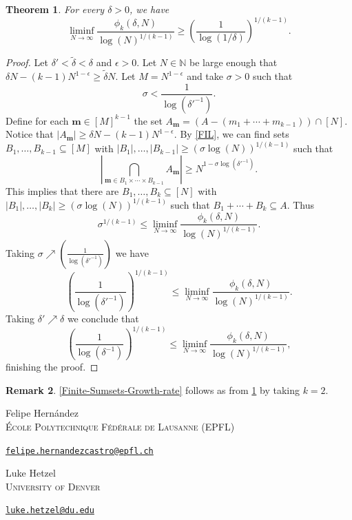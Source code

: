 \documentclass[letter, 11pt]{article}
\theoremstyle{plain} %
\newtheorem{theorem}{Theorem}[section]
\theoremstyle{definition} %
\newtheorem{remark}[theorem]{Remark}
\theoremstyle{plain}
\theoremstyle{plain}
\newcommand{\N}{\mathbb{N}}
\newcommand{\1}{\mathbbm{1}}
\begin{document}
\begin{theorem}\label{theorem-B-general-form}
    For every $\delta>0$, we have 
    $$\liminf_{N\to \infty} \frac{\phi_k(\delta,N)}{\log(N)^{1/(k-1)}} \geq \left(\frac{1}{\log(1/\delta) }\right)^{1/(k-1)}.$$
\end{theorem}
\begin{proof}
Let $\delta'<\tilde{\delta}<\delta$ and $\epsilon>0$. Let $N \in \N$ be large enough that $\delta N-(k-1)N^{1-\epsilon}\geq \tilde{\delta} N$. Let $M=N^{1-\epsilon}$ and take 
$\sigma>0$ such that
    $$\sigma< \frac{1}{\log(\delta'^{-1})} .$$
    Define for each $\boldsymbol{m}\in [M]^{k-1}$ the set $A_{\boldsymbol{m}}= (A-(m_1+\cdots+m_{k-1}))\cap [N]$. Notice that $|A_{\boldsymbol{m}}|\geq \delta N-(k-1)N^{1-\epsilon}$.  
    By \cref{FIL}, we can find sets $B_1,\ldots,B_{k-1}\subseteq [M]$ with $|B_1|,\ldots,|B_{k-1}|\geq (\sigma \log(N))^{1/(k-1)}$ such that 
    $$\left|\bigcap_{\boldsymbol{m}\in B_1\times\cdots \times B_{k-1}} A_{\boldsymbol{m}}\right|\geq N^{1-\sigma\log(\delta'^{-1})}. $$
    This implies that there are $B_1,\ldots,B_k\subseteq [N]$ with $|B_1|,\ldots,|B_k|\geq (\sigma \log(N))^{1/(k-1)}$ such that $B_1+\cdots+B_k\subseteq A$. Thus
    $$ \sigma^{1/(k-1)} \leq \liminf_{N\to \infty} \frac{\phi_k(\delta,N)}{\log(N)^{1/(k-1)}}. $$
    Taking $\sigma \nearrow  \left(\frac{1}{\log(\delta'^{-1})}\right) $ we have
    $$ \left(\frac{1}{\log(\delta'^{-1})}\right)^{1/(k-1)}\leq \liminf_{N\to \infty} \frac{\phi_k(\delta,N)}{\log(N)^{1/(k-1)}}. $$
    Taking $\delta' \nearrow \delta$ we conclude that 
        $$ \left(\frac{1}{\log(\delta^{-1})}\right)^{1/(k-1)}\leq \liminf_{N\to \infty} \frac{\phi_k(\delta,N)}{\log(N)^{1/(k-1)}}, $$
        finishing the proof.
\end{proof}

\begin{remark}
    \cref{Finite-Sumsets-Growth-rate} follows as from \cref{theorem-B-general-form} by taking $k = 2$.
\end{remark}















\small{



}
\bigskip
\noindent
Felipe Hernández\\
\textsc{{\'E}cole Polytechnique F{\'e}d{\'e}rale de Lausanne} (EPFL)\par\nopagebreak
\noindent
\href{mailto:felipe.hernandezcastro@epfl.ch}
{\texttt{felipe.hernandezcastro@epfl.ch}}

\bigskip
\noindent
Luke Hetzel\\
\textsc{University of Denver} \par\nopagebreak
\noindent
\href{mailto:luke.hetzel@du.edu}
{\texttt{luke.hetzel@du.edu}}
\end{document}
